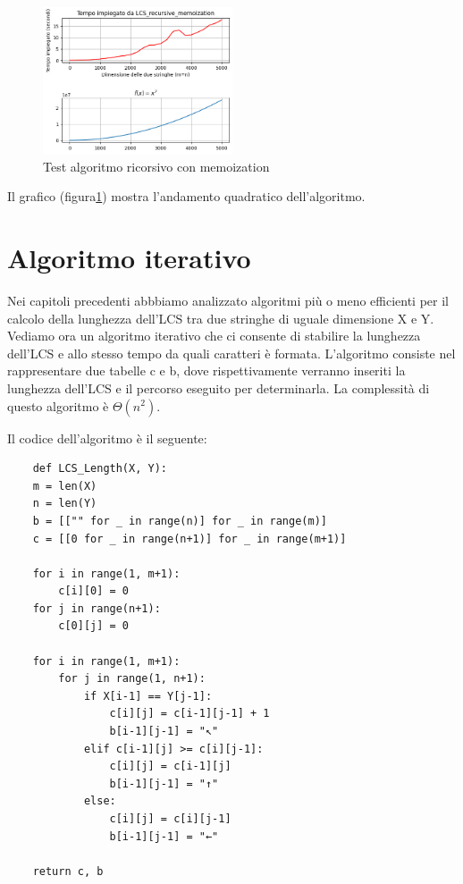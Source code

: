 \documentclass[11pt,a4paper]{article}
\begin{document}
\begin{figure}[htbp]
    \centering
    \includegraphics[width=0.5\textwidth]{LCS_recursive_mem test.png}
    \caption{Test algoritmo ricorsivo con memoization}
    \label{fig:lcs_recursive_mem_test}
\end{figure}
\newpage
Il grafico (figura\ref{fig:lcs_recursive_mem_test}) mostra l'andamento quadratico dell'algoritmo.

\section{Algoritmo iterativo}
Nei capitoli precedenti abbbiamo analizzato algoritmi più o meno efficienti per il calcolo della lunghezza dell'LCS tra due stringhe di uguale dimensione X e Y. Vediamo ora un algoritmo iterativo che ci consente di stabilire la lunghezza dell'LCS e allo stesso tempo da quali caratteri è formata. L'algoritmo consiste nel rappresentare due tabelle c e b, dove rispettivamente verranno inseriti la lunghezza dell'LCS e il percorso eseguito per determinarla. La complessità di questo algoritmo è $\Theta(n^2)$.

Il codice dell'algoritmo è il seguente:

\begin{lstlisting}
    def LCS_Length(X, Y):
    m = len(X)
    n = len(Y)
    b = [["" for _ in range(n)] for _ in range(m)]
    c = [[0 for _ in range(n+1)] for _ in range(m+1)]
    
    for i in range(1, m+1):
        c[i][0] = 0
    for j in range(n+1):
        c[0][j] = 0
        
    for i in range(1, m+1):
        for j in range(1, n+1):
            if X[i-1] == Y[j-1]:
                c[i][j] = c[i-1][j-1] + 1
                b[i-1][j-1] = "↖"
            elif c[i-1][j] >= c[i][j-1]:
                c[i][j] = c[i-1][j]
                b[i-1][j-1] = "↑"
            else:
                c[i][j] = c[i][j-1]
                b[i-1][j-1] = "←"
                
    return c, b
\end{lstlisting}
\end{document}
